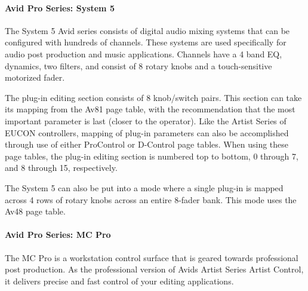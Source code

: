 \hypertarget{a00363_subsubsection__avid_pro_series_system_5_}{}\paragraph{Avid Pro Series\+: System 5}\label{a00363_subsubsection__avid_pro_series_system_5_}
 The System 5 Avid series consists of digital audio mixing systems that can be configured with hundreds of channels. These systems are used specifically for audio post production and music applications. Channels have a 4 band E\+Q, dynamics, two filters, and consist of 8 rotary knobs and a touch-\/sensitive motorized fader.

The plug-\/in editing section consists of 8 knob/switch pairs. This section can take it\textquotesingle{}s mapping from the {\ttfamily Av81} page table, with the recommendation that the most important parameter is last (closer to the operator). Like the Artist Series of E\+U\+C\+O\+N controllers, mapping of plug-\/in parameters can also be accomplished through use of either Pro\+Control or D-\/\+Control page tables. When using these page tables, the plug-\/in editing section is numbered top to bottom, 0 through 7, and 8 through 15, respectively.

The System 5 can also be put into a mode where a single plug-\/in is mapped across 4 rows of rotary knobs across an entire 8-\/fader bank. This mode uses the Av48 page table.

\hypertarget{a00363_subsubsection__avid_pro_series_mc_pro_}{}\paragraph{Avid Pro Series\+: M\+C Pro}\label{a00363_subsubsection__avid_pro_series_mc_pro_}
 The M\+C Pro is a workstation control surface that is geared towards professional post production. As the professional version of Avid\textquotesingle{}s Artist Series Artist Control, it delivers precise and fast control of your editing applications.

